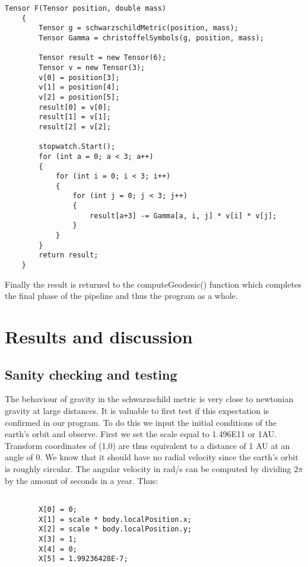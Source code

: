 \documentclass{article}
\begin{document}
\begin{verbatim}
Tensor F(Tensor position, double mass)
    {
        Tensor g = schwarzschildMetric(position, mass);
        Tensor Gamma = christoffelSymbols(g, position, mass);

        Tensor result = new Tensor(6);
        Tensor v = new Tensor(3);
        v[0] = position[3];
        v[1] = position[4];
        v[2] = position[5];
        result[0] = v[0];
        result[1] = v[1];
        result[2] = v[2];

        stopwatch.Start();
        for (int a = 0; a < 3; a++)
        {
            for (int i = 0; i < 3; i++)
            {
                for (int j = 0; j < 3; j++)
                {
                    result[a+3] -= Gamma[a, i, j] * v[i] * v[j];
                }
            }
        }
        return result;
    }
\end{verbatim}

Finally the result is returned to the computeGeodesic() function which completes the final phase of the pipeline and thus the program as a whole.

\newpage
\section{Results and discussion}
\subsection{Sanity checking and testing}

The behaviour of gravity in the schwarzschild metric is very close to newtonian gravity at large distances. It is valuable to first test if this expectation is confirmed in our program. To do this we input the initial conditions of the earth's orbit and observe. First we set the scale equal to 1.496E11 or 1AU. Transform coordinates of (1,0) are thus equivalent to a distance of 1 AU at an angle of 0. We know that it should have no radial velocity since the earth's orbit is roughly circular. The angular velocity in rad/s can be computed by dividing $2\pi$ by the amount of seconds in a year. Thus:

\begin{verbatim}

        X[0] = 0;
        X[1] = scale * body.localPosition.x;
        X[2] = scale * body.localPosition.y;
        X[3] = 1;
        X[4] = 0;
        X[5] = 1.99236428E-7;
\end{verbatim}
\end{document}
